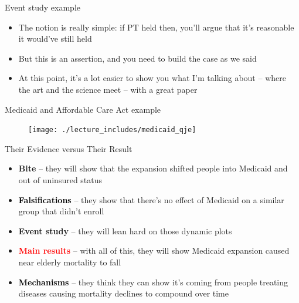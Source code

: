 \documentclass{beamer}
\begin{document}
\begin{frame}{Event study example}

\begin{itemize}
\item The notion is really simple: if PT held then, you'll argue that it's reasonable it would've still held
\item But this is an assertion, and you need to build the case as we said
\item At this point, it's a lot easier to show you what I'm talking about -- where the art and the science meet -- with a great paper
\end{itemize}

\end{frame}




\begin{frame}{Medicaid and Affordable Care Act example}

\begin{figure}
\texttt{[image: ./lecture\_includes/medicaid\_qje]}
\end{figure}

\end{frame}
\begin{frame}{Their Evidence versus Their Result}

\begin{itemize}
\item \textbf{Bite} -- they will show that the expansion shifted people into Medicaid and out of uninsured status
\item \textcolor{black}{\textbf{Falsifications}} -- they show that there's no effect of Medicaid on a similar group that didn't enroll
\item \textbf{Event study} -- they will lean hard on those dynamic plots
\item \textcolor{red}{\textbf{Main results}} -- with all of this, they will show Medicaid expansion caused near elderly mortality to fall
\item \textcolor{black}{\textbf{Mechanisms}} -- they think they can show it's coming from people treating diseases causing mortality declines to compound over time
\end{itemize}

\end{frame}
\end{document}
